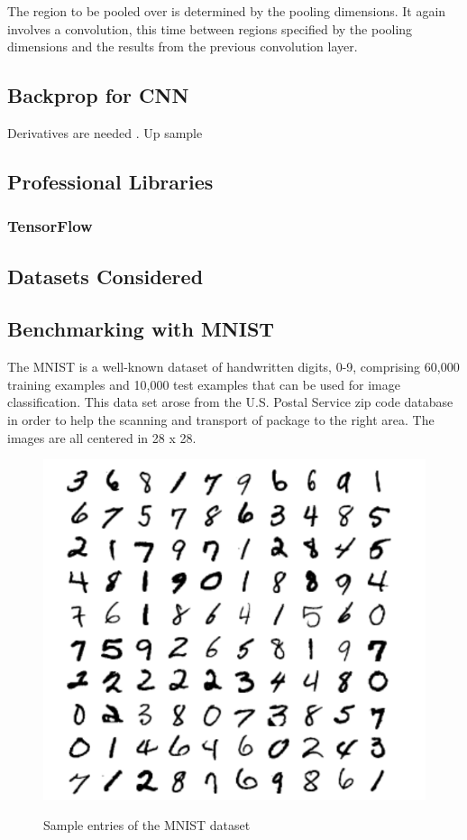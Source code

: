 \documentclass[12pt, twocolumn]{article}
\begin{document}
The region to be pooled over is determined by the pooling dimensions. It again involves a convolution, this time between regions specified by the pooling dimensions and the results from the previous convolution layer. 



\subsection{Backprop for CNN}
Derivatives are needed . Up sample
\subsection{Professional Libraries}
\subsubsection{TensorFlow}



\subsection{Datasets Considered}







\subsection{Benchmarking with MNIST}


The MNIST is a well-known dataset of handwritten digits, 0-9, comprising 60,000 training examples and 10,000 test examples \cite{MNIST}  that can be used for image classification.  This data set arose from the U.S. Postal Service zip code database in order to help the scanning and transport of package to the right area. The images are all centered in 28 x 28.

\begin{figure}
\includegraphics[scale=.8]{MNISTnos.png}
\label{fig:MNISTex}
\caption{Sample entries of the MNIST dataset \cite{LeCun1998}}
\end{figure}
\end{document}
